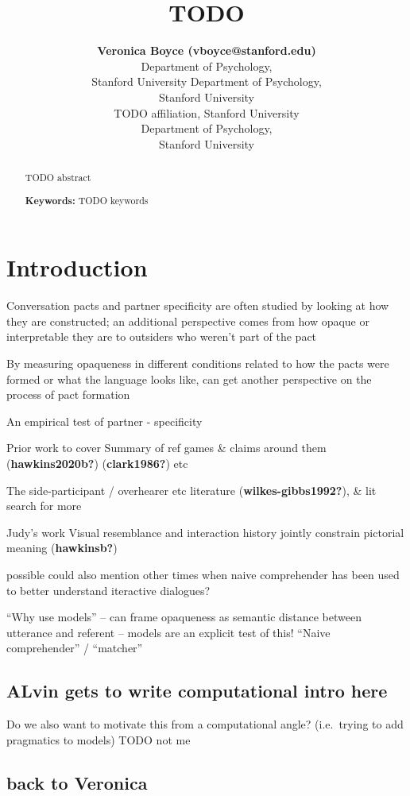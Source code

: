 \documentclass[10pt, letterpaper]{article}
\title{TODO}
\author{{\large \bf Veronica Boyce (vboyce@stanford.edu)} \\ Department of Psychology, \\Stanford University \And {\large \bf Ben (TODO email) } Department of Psychology, \\Stanford University \AND {\large \bf Alvin (TODO email)} \\ TODO affiliation, Stanford University \And {\large \bf Michael C. Frank (mcfrank@stanford.edu)} \\ Department of Psychology, \\ Stanford University}
\begin{document}
\maketitle

\begin{abstract}
TODO abstract

\textbf{Keywords:}
TODO keywords
\end{abstract}

\section{Introduction}\label{introduction}

Conversation pacts and partner specificity are often studied by looking
at how they are constructed; an additional perspective comes from how
opaque or interpretable they are to outsiders who weren't part of the
pact

By measuring opaqueness in different conditions related to how the pacts
were formed or what the language looks like, can get another perspective
on the process of pact formation

An empirical test of partner - specificity

Prior work to cover Summary of ref games \& claims around them
(\textbf{hawkins2020b?}) (\textbf{clark1986?}) etc

The side-participant / overhearer etc literature
(\textbf{wilkes-gibbs1992?}), \& lit search for more

Judy's work Visual resemblance and interaction history jointly constrain
pictorial meaning (\textbf{hawkinsb?})

possible could also mention other times when naive comprehender has been
used to better understand iteractive dialogues?

``Why use models'' -- can frame opaqueness as semantic distance between
utterance and referent -- models are an explicit test of this! ``Naive
comprehender'' / ``matcher''

\subsection{ALvin gets to write computational intro
here}\label{alvin-gets-to-write-computational-intro-here}

Do we also want to motivate this from a computational angle?
(i.e.~trying to add pragmatics to models) TODO not me

\subsection{back to Veronica}\label{back-to-veronica}
\end{document}
